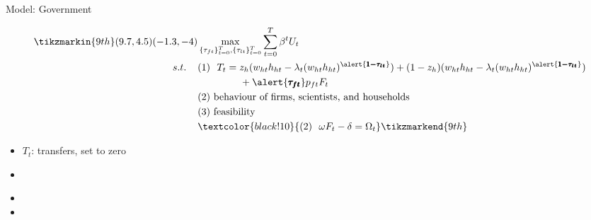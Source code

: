 \documentclass[11pt,aspectratio=169]{beamer}
\begin{document}
\addtocounter{framenumber}{-1}
\begin{frame}{Model: Government}
	\begin{minipage}[t!]{1\textwidth}
		\begin{align*}
		\tikzmarkin{9th}(9.7,4.5)(-1.3,-4)
		&\max_{\{\tau_{ft}\}_{t=0}^{T}, \{\tau_{lt}\}_{t=0}^{T}} \sum_{t=0}^{T}\beta^t U_{t}\\
		s.t. \hspace{4mm}
		&(1)\ \ T_t= z_h(w_{ht}h_{ht}-\lambda_t(w_{ht}h_{ht})^{\alert{\pmb{1-\tau_{lt}}}})+(1-z_h)(w_{ht}h_{ht}-\lambda_t(w_{ht}h_{ht})^{\alert{\pmb{1-\tau_{lt}}}})\\ & \hspace{15mm }+\alert{\pmb{\tau_{ft}}}p_{ft}F_{t}\\
		& (2)\ \text{behaviour of firms, scientists, and households}\\
		& (3)\ \text{feasibility} \\
		&\textcolor{black!10}{
			(2)\ \  \omega F_t-\delta =\Omega_t }
		\tikzmarkend{9th}
		\end{align*}
	\end{minipage}
	
	\small
	\vspace{0mm}
	\begin{minipage}[t!]{0.35\textwidth}
		\vspace{7mm}
		\begin{itemize}
			\item[] $T_t$: transfers, set to zero  \vspace{0mm}
			\item[] 
		\end{itemize}
	\end{minipage}
	\begin{minipage}[t!]{0.6\textwidth}
		\vspace{8mm}
		\begin{itemize}
			\item[]%
			\vspace{0mm}	
			\item[] %
		\end{itemize}
	\end{minipage}
	
\end{frame}
\end{document}
